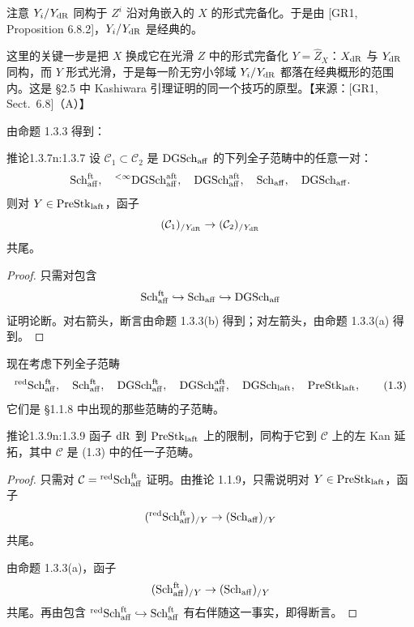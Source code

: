 注意 $Y_i/Y_{\mathrm{dR}}$ 同构于 $Z^i$ 沿对角嵌入的 $X$ 的形式完备化。于是由 [GR1, Proposition 6.8.2]，$Y_i/Y_{\mathrm{dR}}$ 是经典的。

\begin{annote}
这里的关键一步是把 $X$ 换成它在光滑 $Z$ 中的形式完备化 $Y=\widehat{Z}_X$：$X_{\mathrm{dR}}$ 与 $Y_{\mathrm{dR}}$ 同构，而 $Y$ 形式光滑，于是每一阶无穷小邻域 $Y_i/Y_{\mathrm{dR}}$ 都落在经典概形的范围内。这是 §2.5 中 Kashiwara 引理证明的同一个技巧的原型。\hfill【来源：[GR1, Sect.~6.8]（A）】
\end{annote}

由命题 1.3.3 得到：

\begin{othm}{推论}{1.3.7}{n:1.3.7}
设 $\mathcal{C}_1\subset\mathcal{C}_2$ 是 $\mathrm{DGSch}_{\mathrm{aff}}$ 的下列全子范畴中的任意一对：
\[
\mathrm{Sch}_{\mathrm{aff}}^{\mathrm{ft}},\quad {}^{<\infty}\mathrm{DGSch}_{\mathrm{aff}}^{\mathrm{aft}},\quad \mathrm{DGSch}_{\mathrm{aff}}^{\mathrm{aft}},\quad \mathrm{Sch}_{\mathrm{aff}},\quad \mathrm{DGSch}_{\mathrm{aff}}.
\]
则对 $Y\in\mathrm{PreStk}_{\mathrm{laft}}$，函子
\[
(\mathcal{C}_1)_{/Y_{\mathrm{dR}}}\to(\mathcal{C}_2)_{/Y_{\mathrm{dR}}}
\]
共尾。
\end{othm}

\begin{proof}
只需对包含
\[
\mathrm{Sch}_{\mathrm{aff}}^{\mathrm{ft}}\hookrightarrow\mathrm{Sch}_{\mathrm{aff}}\hookrightarrow\mathrm{DGSch}_{\mathrm{aff}}
\]
证明论断。对右箭头，断言由命题 1.3.3(b) 得到；对左箭头，由命题 1.3.3(a) 得到。
\end{proof}

现在考虑下列全子范畴
\begin{equation}
{}^{\mathrm{red}}\mathrm{Sch}_{\mathrm{aff}}^{\mathrm{ft}},\quad \mathrm{Sch}_{\mathrm{aff}}^{\mathrm{ft}},\quad \mathrm{DGSch}_{\mathrm{aff}}^{\mathrm{ft}},\quad \mathrm{DGSch}_{\mathrm{aff}}^{\mathrm{aft}},\quad \mathrm{DGSch}_{\mathrm{laft}},\quad \mathrm{PreStk}_{\mathrm{laft}},\tag{1.3}
\end{equation}
它们是 §1.1.8 中出现的那些范畴的子范畴。

\begin{othm}{推论}{1.3.9}{n:1.3.9}
函子 $\mathrm{dR}$ 到 $\mathrm{PreStk}_{\mathrm{laft}}$ 上的限制，同构于它到 $\mathcal{C}$ 上的左 Kan 延拓，其中 $\mathcal{C}$ 是 (1.3) 中的任一子范畴。
\end{othm}

\begin{proof}
只需对 $\mathcal{C}={}^{\mathrm{red}}\mathrm{Sch}_{\mathrm{aff}}^{\mathrm{ft}}$ 证明。由推论 1.1.9，只需说明对 $Y\in\mathrm{PreStk}_{\mathrm{laft}}$，函子
\[
({}^{\mathrm{red}}\mathrm{Sch}_{\mathrm{aff}}^{\mathrm{ft}})_{/Y}\to(\mathrm{Sch}_{\mathrm{aff}})_{/Y}
\]
共尾。

由命题 1.3.3(a)，函子
\[
(\mathrm{Sch}_{\mathrm{aff}}^{\mathrm{ft}})_{/Y}\to(\mathrm{Sch}_{\mathrm{aff}})_{/Y}
\]
共尾。再由包含 ${}^{\mathrm{red}}\mathrm{Sch}_{\mathrm{aff}}^{\mathrm{ft}}\hookrightarrow\mathrm{Sch}_{\mathrm{aff}}^{\mathrm{ft}}$ 有右伴随这一事实，即得断言。
\end{proof}
